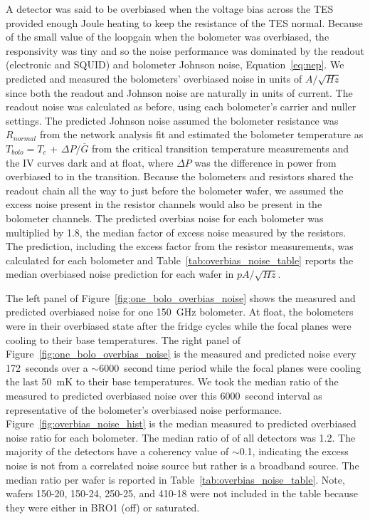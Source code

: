 A detector was said to be overbiased when the voltage bias across the \ac{TES} provided enough Joule heating to keep the resistance of the \ac{TES} normal. 
Because of the small value of the loopgain when the bolometer was overbiased, the responsivity was tiny and so the noise performance was dominated by the readout (electronic and \ac{SQUID}) and bolometer Johnson noise, Equation~\ref{eq:nep}. 
We predicted and measured the bolometers' overbiased noise in units of $A/\sqrt{Hz}$ since both the readout and Johnson noise are naturally in units of current.  
The readout noise was calculated as before, using each bolometer's carrier and nuller settings. 
The predicted Johnson noise assumed the bolometer resistance was $R_{normal}$ from the network analysis fit and estimated the bolometer temperature as $T_{bolo} = T_{c}$ + $\Delta P / \overline{G}$ from the critical transition temperature measurements and the IV curves dark and at float, where $\Delta P$ was the difference in power from overbiased to in the transition. 
Because the bolometers and resistors shared the readout chain all the way to just before the bolometer wafer, we assumed the excess noise present in the resistor channels would also be present in the bolometer channels. 
The predicted overbias noise for each bolometer was multiplied by 1.8, the median factor of excess noise measured by the resistors. 
The prediction, including the excess factor from the resistor measurements, was calculated for each bolometer and Table~\ref{tab:overbias_noise_table} reports the median overbiased noise prediction for each wafer in $pA/\sqrt{Hz}$. %

The left panel of Figure~\ref{fig:one_bolo_overbias_noise} shows the measured and predicted overbiased noise for one 150~GHz bolometer. 
At float, the bolometers were in their overbiased state after the fridge cycles while the focal planes were cooling to their base temperatures. 
The right panel of Figure~\ref{fig:one_bolo_overbias_noise} is the measured and predicted noise every 172~seconds over a $\sim$6000~second time period while the focal planes were cooling the last 50~mK to their base temperatures.
We took the median ratio of the measured to predicted overbiased noise over this 6000~second interval as representative of the bolometer's overbiased noise performance.
Figure~\ref{fig:overbias_noise_hist} is the median measured to predicted overbiased noise ratio for each bolometer. 
The median ratio of of all detectors was 1.2. 
The majority of the detectors have a coherency value of $\sim$0.1, indicating the excess noise is not from a correlated noise source but rather is a broadband source. 
The median ratio per wafer is reported in Table~\ref{tab:overbias_noise_table}.
Note, wafers 150-20, 150-24, 250-25, and 410-18 were not included in the table because they were either in \ac{BRO}1 (off) or saturated. 

